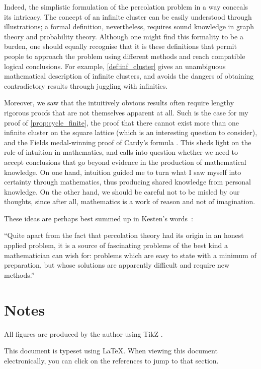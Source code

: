 \documentclass[a4paper, 12pt]{article}
\begin{document}
Indeed, the simplistic formulation of the percolation problem in a way conceals its intricacy. The concept of an infinite cluster can be easily understood through illustrations; a formal definition, nevertheless, requires sound knowledge in graph theory and probability theory. Although one might find this formality to be a burden, one should equally recognise that it is these definitions that permit people to approach the problem using different methods and reach compatible logical conclusions. For example, \cref{def:inf_cluster} gives an unambiguous mathematical description of infinite clusters, and avoids the dangers of obtaining contradictory results through juggling with infinities.

Moreover, we saw that the intuitively obvious results often require lengthy rigorous proofs that are not themselves apparent at all. Such is the case for my proof of \cref{prop:cycle_finite}, the proof that there cannot exist more than one infinite cluster on the square lattice (which is an interesting question to consider), and the Fields medal-winning proof of Cardy's formula \autocite[1]{smirnov_2001}. This sheds light on the role of intuition in mathematics, and calls into question whether we need to accept conclusions that go beyond evidence in the production of mathematical knowledge. On one hand, intuition guided me to turn what I saw myself into certainty through mathematics, thus producing shared knowledge from personal knowledge. On the other hand, we should be careful not to be misled by our thoughts, since after all, mathematics is a work of reason and not of imagination.

These ideas are perhaps best summed up in Kesten's words~\autocite[vii]{grimmett_1999}:

\begin{displayquote}
``Quite apart from the fact that percolation theory had its origin in an honest applied problem, it is a source of fascinating problems of the best kind a mathematician can wish for: problems which are easy to state with a minimum of preparation, but whose solutions are apparently difficult and require new methods.''
\end{displayquote}

\section*{Notes}
All figures are produced by the author using TikZ \autocite{tantau:2013a}.

This document is typeset using \LaTeX. When viewing this document electronically, you can click on the references to jump to that section.


\newpage
\printbibliography
\thispagestyle{empty}
\end{document}
